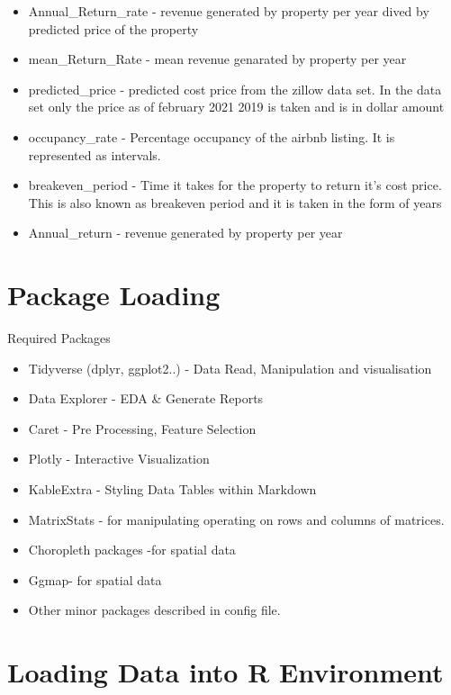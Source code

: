 \documentclass[
]{article}
\providecommand{\tightlist}{%
  \setlength{\itemsep}{0pt}\setlength{\parskip}{0pt}}
\begin{document}
\begin{itemize}
\tightlist
\item
  Annual\_Return\_rate - revenue generated by property per year dived by
  predicted price of the property
\item
  mean\_Return\_Rate - mean revenue genarated by property per year
\item
  predicted\_price - predicted cost price from the zillow data set. In
  the data set only the price as of february 2021 2019 is taken and is
  in dollar amount
\item
  occupancy\_rate - Percentage occupancy of the airbnb listing. It is
  represented as intervals.
\item
  breakeven\_period - Time it takes for the property to return it's cost
  price. This is also known as breakeven period and it is taken in the
  form of years
\item
  Annual\_return - revenue generated by property per year
\end{itemize}

\hypertarget{package-loading}{%
\section{Package Loading}\label{package-loading}}

Required Packages

\begin{itemize}
\tightlist
\item
  Tidyverse (dplyr, ggplot2..) - Data Read, Manipulation and
  visualisation
\item
  Data Explorer - EDA \& Generate Reports
\item
  Caret - Pre Processing, Feature Selection
\item
  Plotly - Interactive Visualization
\item
  KableExtra - Styling Data Tables within Markdown
\item
  MatrixStats - for manipulating operating on rows and columns of
  matrices.
\item
  Choropleth packages -for spatial data
\item
  Ggmap- for spatial data
\item
  Other minor packages described in config file.
\end{itemize}

\hypertarget{loading-data-into-r-environment}{%
\section{Loading Data into R
Environment}\label{loading-data-into-r-environment}}
\end{document}
